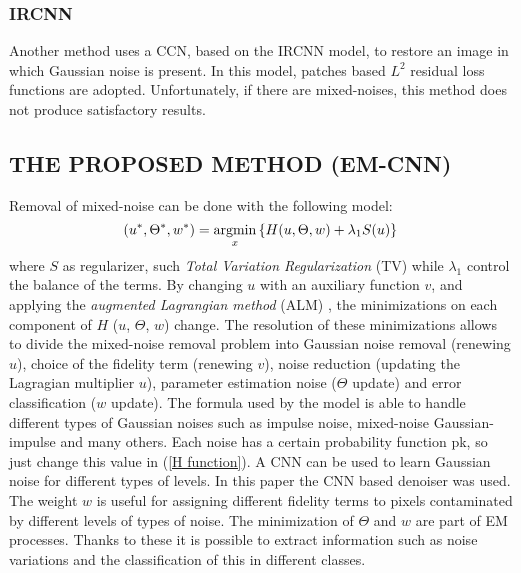 \subsubsection{IRCNN}
Another method \cite{0884882819} uses a CCN, based on the IRCNN model, to restore an 
image in which Gaussian noise is present. In this model, patches based $ L^2 $ 
residual loss functions are adopted. Unfortunately, if there are mixed-noises, 
this method does not produce satisfactory results.

\subsection{THE PROPOSED METHOD (EM-CNN)}
Removal of mixed-noise can be done with the following model:
\begin{equation}
    (u^*, \Theta^*, w^*) = \operatorname*{argmin}_x\left\{H(u,\Theta,w) + \lambda_1S(u)\right\}
\end{equation}
where $ S $ as regularizer, such \emph{Total Variation Regularization} (TV) while $ \lambda_1 $ 
control the balance of the terms. By changing $u$ with an auxiliary function 
$v$, and applying the \emph{augmented Lagrangian method} (ALM) \cite{0884882833}, the minimizations 
on each component of $H$ ($u$, $\Theta$, $w$) change. The resolution of these 
minimizations allows to divide the mixed-noise removal problem into Gaussian 
noise removal (renewing $u$), choice of the fidelity term (renewing $v$), 
noise reduction (updating the Lagragian multiplier $u$), parameter estimation 
noise ($\Theta$ update) and error classification ($w$ update). The formula used by 
the model is able to handle different types of Gaussian noises such as impulse 
noise, mixed-noise Gaussian-impulse and many others. Each noise has 
a certain probability function pk, so just change this value in (\ref{H function}). A CNN 
can be used to learn Gaussian noise for different types of levels. In this paper 
the CNN based denoiser \cite{0884882819} was used. The weight $w$ is useful for assigning 
different fidelity terms to pixels contaminated by different levels of types of 
noise. The minimization of $\Theta$ and $w$ are part of EM processes. Thanks to 
these it is possible to extract information such as noise variations and the 
classification of this in different classes.
